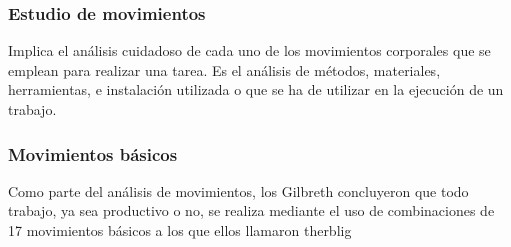 \subsubsection{Estudio de movimientos}

Implica el análisis cuidadoso de cada uno de los movimientos corporales que se emplean para realizar una tarea. 
\cite{niebel1980ingenieria}
Es el análisis de métodos, materiales, herramientas, e instalación utilizada o que se ha de utilizar en la ejecución de un trabajo.

\subsubsection{Movimientos básicos} 
Como parte del análisis de movimientos, los Gilbreth concluyeron que todo trabajo, ya sea productivo o no, se realiza mediante el uso de combinaciones de 17 movimientos básicos a los que ellos llamaron therblig \cite{niebel1980ingenieria}  

